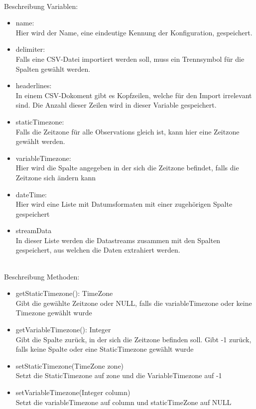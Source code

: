 \documentclass[a4paper, 12 pt, titlepage]{article}
\begin{document}
\ \\
Beschreibung Variablen:
\begin{itemize}
	\item name:\\Hier wird der Name, eine eindeutige Kennung der Konfiguration, gespeichert.
	
	\item delimiter: \\Falls eine CSV-Datei importiert werden soll, muss ein Trennsymbol für die Spalten gewählt werden.
	
	\item headerlines: \\In einem CSV-Dokoment gibt es Kopfzeilen, welche für den Import irrelevant sind. Die Anzahl dieser Zeilen wird in dieser Variable gespeichert.
	
	\item staticTimezone: \\Falls die Zeitzone für alle Observations gleich ist, kann hier eine Zeitzone gewählt werden.
	
	\item variableTimezone: \\Hier wird die Spalte angegeben in der sich die Zeitzone befindet, falls die Zeitzone sich ändern kann
	
	\item dateTime:\\Hier wird eine Liste mit Datumsformaten mit einer zugehörigen Spalte gespeichert
	
	\item streamData\\ In dieser Liste werden die Datastreams zusammen mit den Spalten gespeichert, aus welchen die Daten extrahiert werden.
	
\end{itemize}
\ \\
Beschreibung Methoden:
\begin{itemize}
	\item getStaticTimezone(): TimeZone\\
	Gibt die gewählte Zeitzone oder NULL, falls die variableTimezone oder keine Timezone gewählt wurde
	
	\item getVariableTimezone(): Integer\\
	Gibt die Spalte zurück, in der sich die Zeitzone befinden soll.
	Gibt -1 zurück, falls keine Spalte oder eine StaticTimezone gewählt wurde
	
	\item setStaticTimezone(TimeZone zone) \\
	Setzt die StaticTimezone auf zone und die VariableTimezone auf -1
	
	\item setVariableTimezone(Integer column) \\
	Setzt die variableTimezone auf column und staticTimeZone auf NULL
\end{itemize}
\end{document}
